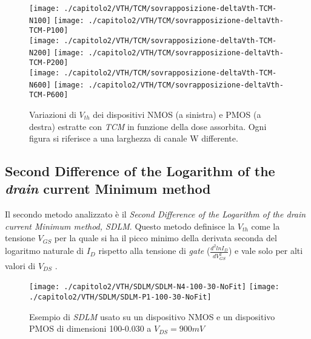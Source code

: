 \vfill

\clearpage
\begin{figure}[ht]
  \centering
  \texttt{[image: ./capitolo2/VTH/TCM/sovrapposizione-deltaVth-TCM-N100]}
  \texttt{[image: ./capitolo2/VTH/TCM/sovrapposizione-deltaVth-TCM-P100]}\\
  \vspace{0.2cm}
  \texttt{[image: ./capitolo2/VTH/TCM/sovrapposizione-deltaVth-TCM-N200]}
  \texttt{[image: ./capitolo2/VTH/TCM/sovrapposizione-deltaVth-TCM-P200]}\\
  \vspace{0.2cm}
  \texttt{[image: ./capitolo2/VTH/TCM/sovrapposizione-deltaVth-TCM-N600]}
  \texttt{[image: ./capitolo2/VTH/TCM/sovrapposizione-deltaVth-TCM-P600]}

  \caption[Dati $\Delta V_{th}$ estratti con TCM]{Variazioni di $V_{th}$ dei dispositivi NMOS (a sinistra) e PMOS (a destra) estratte con \emph{TCM} in funzione della dose assorbita. Ogni figura si riferisce a una larghezza di canale W differente.}
  \label{fig:deltaVthTCM}
\end{figure}

\FloatBarrier

\subsection[SDLM]{Second Difference of the Logarithm of the \emph{drain} current Minimum method}
Il secondo metodo analizzato è il \emph{Second Difference of the Logarithm of the drain current Minimum method, SDLM}. Questo metodo definisce la $V_{th}$ come la tensione $V_{GS}$ per la quale si ha il picco minimo della derivata seconda del logaritmo naturale di $I_D$ rispetto alla tensione di \emph{gate} ($\frac{d^2lnI_D}{dV_{GS}^2}$) e vale solo per alti valori di $V_{DS}$ \cite{art1}.


\begin{figure}[ht]
  \centering
  \texttt{[image: ./capitolo2/VTH/SDLM/SDLM-N4-100-30-NoFit]}
  \texttt{[image: ./capitolo2/VTH/SDLM/SDLM-P1-100-30-NoFit]}
  \caption[Applicazione SDLM senza fit polinomiale]{Esempio di \emph{SDLM} usato su un dispositivo NMOS e un dispositivo PMOS di dimensioni 100-0.030 a $V_{DS} = 900 mV$}
\end{figure}

